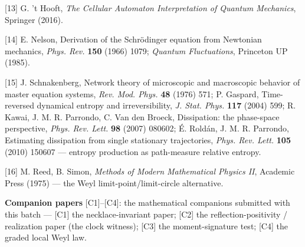 \documentclass[11pt]{article}
\begin{document}
[13] G. 't Hooft, \emph{The Cellular Automaton Interpretation of Quantum Mechanics}, Springer (2016).

[14] E. Nelson, Derivation of the Schrödinger equation from Newtonian mechanics, \emph{Phys. Rev.} \textbf{150} (1966) 1079; \emph{Quantum Fluctuations}, Princeton UP (1985).

[15] J. Schnakenberg, Network theory of microscopic and macroscopic behavior of master equation systems, \emph{Rev. Mod. Phys.} \textbf{48} (1976) 571; P. Gaspard, Time-reversed dynamical entropy and irreversibility, \emph{J. Stat. Phys.} \textbf{117} (2004) 599; R. Kawai, J. M. R. Parrondo, C. Van den Broeck, Dissipation: the phase-space perspective, \emph{Phys. Rev. Lett.} \textbf{98} (2007) 080602; É. Roldán, J. M. R. Parrondo, Estimating dissipation from single stationary trajectories, \emph{Phys. Rev. Lett.} \textbf{105} (2010) 150607 — entropy production as path-measure relative entropy.

[16] M. Reed, B. Simon, \emph{Methods of Modern Mathematical Physics II}, Academic Press (1975) — the Weyl limit-point/limit-circle alternative.

\textbf{Companion papers} [C1]–[C4]: the mathematical companions submitted with this batch — [C1] the necklace-invariant paper; [C2] the reflection-positivity / realization paper (the clock witness); [C3] the moment-signature test; [C4] the graded local Weyl law.
\end{document}
